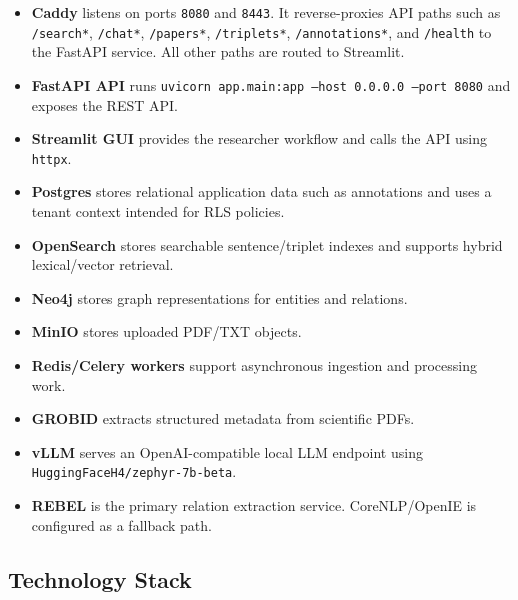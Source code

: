 \documentclass[10pt,letterpaper]{article}
\begin{document}
\begin{itemize}
\item \textbf{Caddy} listens on ports \texttt{8080} and \texttt{8443}. It reverse-proxies API paths such as \texttt{/search*}, \texttt{/chat*}, \texttt{/papers*}, \texttt{/triplets*}, \texttt{/annotations*}, and \texttt{/health} to the FastAPI service. All other paths are routed to Streamlit.
\item \textbf{FastAPI API} runs \texttt{uvicorn app.main:app --host 0.0.0.0 --port 8080} and exposes the REST API.
\item \textbf{Streamlit GUI} provides the researcher workflow and calls the API using \texttt{httpx}.
\item \textbf{Postgres} stores relational application data such as annotations and uses a tenant context intended for RLS policies.
\item \textbf{OpenSearch} stores searchable sentence/triplet indexes and supports hybrid lexical/vector retrieval.
\item \textbf{Neo4j} stores graph representations for entities and relations.
\item \textbf{MinIO} stores uploaded PDF/TXT objects.
\item \textbf{Redis/Celery workers} support asynchronous ingestion and processing work.
\item \textbf{GROBID} extracts structured metadata from scientific PDFs.
\item \textbf{vLLM} serves an OpenAI-compatible local LLM endpoint using \texttt{HuggingFaceH4/zephyr-7b-beta}.
\item \textbf{REBEL} is the primary relation extraction service. CoreNLP/OpenIE is configured as a fallback path.
\end{itemize}

\subsection{Technology Stack}
\end{document}
